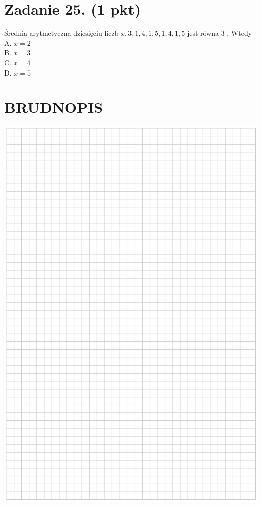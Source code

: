 \documentclass[10pt]{article}
\begin{document}
\section*{Zadanie 25. (1 pkt)}
Średnia arytmetyczna dziesięciu liczb \(x, 3,1,4,1,5,1,4,1,5\) jest równa 3 . Wtedy\\
A. \(x=2\)\\
B. \(x=3\)\\
C. \(x=4\)\\
D. \(x=5\)

\section*{BRUDNOPIS}
\begin{center}
\includegraphics[max width=\textwidth]{2024_11_21_caf6b2e64dd65c9b24eeg-09}
\end{center}
\end{document}
